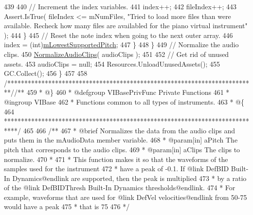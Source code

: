 \begin{DoxyCodeInclude}
439 
440                     \textcolor{comment}{// Increment the index variables.}
441                     index++;
442                     fileIndex++;
443                     Assert.IsTrue( fileIndex <= mNumFiles, \textcolor{stringliteral}{"Tried to load more files than were available.
       Recheck how many files are availabled for the piano virtual instrument"} );
444                 \}
445                 \textcolor{comment}{// Reset the note index when going to the next outer array. }
446                 index = (int)\hyperlink{group___v_i_base_pro_var_ga3cae52b1bcc0178a8a6b03c7aaf7aac8}{mLowestSupportedPitch};
447             \}
448         \}
449         \textcolor{comment}{// Normalize the audio clips.}
450         \hyperlink{group___v_i_base_priv_func_ga0262de8cfb1e671b01ba76de2e9d140a}{NormalizeAudioClips}( audioClips );
451 
452         \textcolor{comment}{// Get rid of unused assets.}
453         audioClips = null;
454         Resources.UnloadUnusedAssets();
455         GC.Collect();
456     \}
457 
458     \textcolor{comment}{/*************************************************************************/}\textcolor{comment}{/** }
459 \textcolor{comment}{     * @\}}
460 \textcolor{comment}{     * @defgroup VIBasePrivFunc Private Functions}
461 \textcolor{comment}{     * @ingroup VIBase}
462 \textcolor{comment}{     * Functions common to all types of instruments.}
463 \textcolor{comment}{     * @\{}
464 \textcolor{comment}{     ****************************************************************************/}
465 \textcolor{comment}{}
466 \textcolor{comment}{    /**}
467 \textcolor{comment}{     * @brief Normalizes the data from the audio clips and puts them in the mAudioData member variable.}
468 \textcolor{comment}{     * @param[in] aPitch The pitch that corresponds to the audio clips.}
469 \textcolor{comment}{     * @param[in] aClips The clips to normalize.}
470 \textcolor{comment}{     * }
471 \textcolor{comment}{     * This function makes it so that the waveforms of the samples used for the instrument}
472 \textcolor{comment}{     * have a peak of -0.1. If @link DefBID Built-In Dynamics@endlink are supported, then the peak is
       multiplied}
473 \textcolor{comment}{     * by a ratio of the @link DefBIDThresh Built-In Dynamics thresholds@endlink. }
474 \textcolor{comment}{     * For example, waveforms that are used for @link DefVel velocities@endlink from 50-75 would have a
       peak }
475 \textcolor{comment}{     * that is 75%
476 \textcolor{comment}{    */}
}
\end{DoxyCodeInclude}
